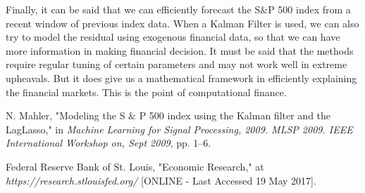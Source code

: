 \documentclass[11pt, fleqn]{article}
\begin{document}
Finally, it can be said that we can efficiently forecast the S\&P 500 index from a recent window of previous index data. When a Kalman Filter is used, we can also try to model the residual using exogenous financial data, so that we can have more information in making financial decision. It must be said that the methods require regular tuning of certain parameters and may not work well in extreme upheavals. But it does give us a mathematical framework in efficiently explaining the financial markets. This is the point of computational finance.

\begin{thebibliography}{9}
N. Mahler, "Modeling the S \& P 500 index using the Kalman filter and the LagLasso," in \textit{Machine Learning for Signal Processing, 2009. MLSP 2009. IEEE International Workshop on, Sept 2009}, pp. 1–6.

Federal Reserve Bank of St. Louis, "Economic Research," at \textit{https://research.stlouisfed.org/} [ONLINE - Last Accessed 19 May 2017].

\end{thebibliography}
\end{document}
